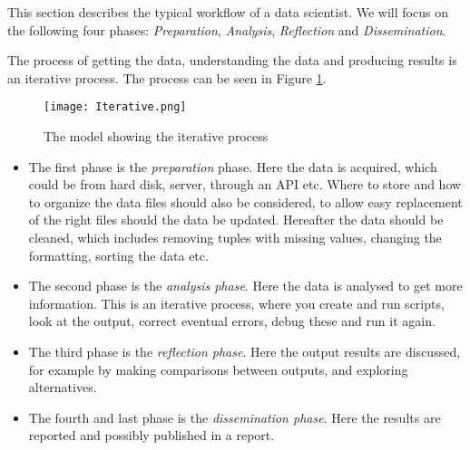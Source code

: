 \documentclass[Report.tex]{subfiles}
\begin{document}
This section describes the typical workflow of a data scientist. We will focus on the following four phases: \emph{Preparation}, \emph{Analysis}, \emph{Reflection} and \emph{Dissemination}.

The process of getting the data, understanding the data and producing results is an iterative process. The process can be seen in Figure \ref{Fig:Iterative}.

\begin{figure}
\center
\texttt{[image: Iterative.png]}
\caption{The model showing the iterative process \cite[Chapter 2]{Guo}}
\label{Fig:Iterative}
\end{figure}
\begin{itemize}


\item The first phase is the \emph{preparation} phase. Here the data is acquired, which could be from hard disk, server, through an API etc. Where to store and how to organize the data files should also be considered, to allow easy replacement of the right files should the data be updated. Hereafter the data should be cleaned, which includes removing tuples with missing values, changing the formatting, sorting the data etc.


\item The second phase is the \emph{analysis phase}. Here the data is analysed to get more information. This is an iterative process, where you create and run scripts,  look at the output, correct eventual errors, debug these and run it again. 

\item The third phase is the \emph{reflection phase}. Here the output results are discussed, for example by making comparisons between outputs, and exploring alternatives.

\item The fourth and last phase is the \emph{dissemination phase}. Here the results are reported and possibly published in a report.
\cite[Chapter 2]{Guo}


\end{itemize}
\end{document}
